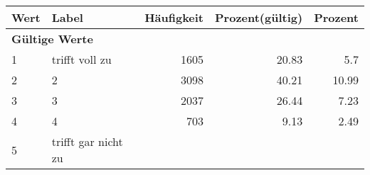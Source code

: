      \begin{longtable}{lXrrr}
     \toprule
     \textbf{Wert} & \textbf{Label} & \textbf{Häufigkeit} & \textbf{Prozent(gültig)} & \textbf{Prozent} \\
     \endhead
     \midrule
     \multicolumn{5}{l}{\textbf{Gültige Werte}}\\

     1 &
     \multicolumn{1}{X}{ trifft voll zu   } &


       \num{1605} &
       \num[round-mode=places,round-precision=2]{20,83} &
         \num[round-mode=places,round-precision=2]{5,7} \\

     2 &
     \multicolumn{1}{X}{ 2   } &


       \num{3098} &
       \num[round-mode=places,round-precision=2]{40,21} &
         \num[round-mode=places,round-precision=2]{10,99} \\

     3 &
     \multicolumn{1}{X}{ 3   } &


       \num{2037} &
       \num[round-mode=places,round-precision=2]{26,44} &
         \num[round-mode=places,round-precision=2]{7,23} \\

     4 &
     \multicolumn{1}{X}{ 4   } &


       \num{703} &
       \num[round-mode=places,round-precision=2]{9,13} &
         \num[round-mode=places,round-precision=2]{2,49} \\

     5 &
     \multicolumn{1}{X}{ trifft gar nicht zu   } &



\end{longtable}
